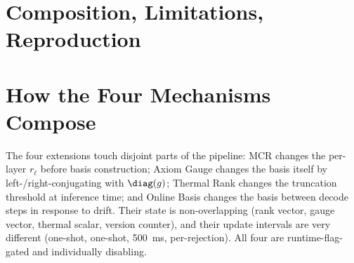 \documentclass[11pt]{article}
\begin{document}
\section*{Composition, Limitations, Reproduction}

\section{How the Four Mechanisms Compose}
\label{sec:compose}
The four extensions touch disjoint parts of the pipeline:
MCR changes the per-layer $r_\ell$ before basis construction;
Axiom Gauge changes the basis itself by left-/right-conjugating with
$\diag(g)$; Thermal Rank changes the truncation threshold at inference
time; and Online Basis changes the basis between decode steps in response
to drift.  Their state is non-overlapping (rank vector, gauge vector,
thermal scalar, version counter), and their update intervals are very
different (one-shot, one-shot, 500~ms, per-rejection).  All four are
runtime-flag-gated and individually disabling.
\end{document}
